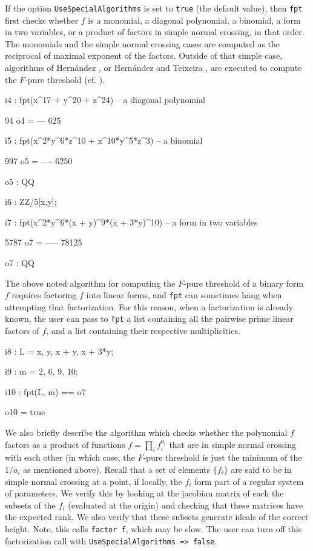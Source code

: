 \documentclass{amsart}
\begin{document}
If the option {\tt UseSpecialAlgorithms} is set to {\tt true} (the default value), then {\tt fpt} first checks whether $f$ is a monomial, a diagonal polynomial, a binomial, a form in two variables, or a product of factors in simple normal crossing, in that order.  The monomials and the simple normal crossing cases are computed as the reciprocal of maximal exponent of the factors.
Outside of that simple case, algorithms of Hern\'andez \cite{HernandezFInvariantsOfDiagonalHyp, HernandezFPureThresholdOfBinomial}, or Hern\'andez and Teixeira \cite{HernandezTeixeiraFThresholdFunctions},  are executed to compute the $F$-pure threshold (cf. \cite{ShibutaTakagiLCThresholds}).

{\small
{}
\begin{MyVerbatim}

i4 : fpt(x^17 + y^20 + z^24) -- a diagonal polynomial

      94
o4 = ---
     625

i5 : fpt(x^2*y^6*z^10 + x^10*y^5*z^3) -- a binomial

      997
o5 = ----
     6250

o5 : QQ

i6 : ZZ/5[x,y];

i7 : fpt(x^2*y^6*(x + y)^9*(x + 3*y)^10) -- a form in two variables

      5787
o7 = -----
     78125

o7 : QQ
\end{MyVerbatim}
}
\medspace

The above noted algorithm for computing the $F$-pure threshold of a binary form $f$ requires factoring $f$ into linear forms, and {\tt fpt} can sometimes hang when attempting that factorization. For this reason, when a factorization is already known, the user can pass to {\tt fpt} a list containing all the pairwise prime linear factors of $f$, and a list containing their respective multiplicities.

{\small
{}
\begin{MyVerbatim}

i8 : L = {x, y, x + y, x + 3*y};

i9 : m = {2, 6, 9, 10};

i10 : fpt(L, m) == o7

o10 = true
\end{MyVerbatim}
}
\medspace
We also briefly describe the algorithm which checks whether the polynomial $f$ factors as a product of functions $f = \prod_i f_i^{a_i}$ that are in simple normal crossing with each other (in which case, the $F$-pure threshold is just the minimum of the $1/a_i$ as mentioned above).  Recall that a set of elements $\{f_i\}$ are said to be in simple normal crossing at a point, if locally, the $f_i$ form part of a regular system of parameters.  We verify this by looking at the jacobian matrix of each the subsets of the $f_i$ (evaluated at the origin) and checking that these matrices have the expected rank.  We also verify that these subsets generate ideals of the correct height.  Note, this calls {\tt factor f}, which may be slow.  The user can turn off this factorization call with {\tt UseSpecialAlgorithms => false}.
\end{document}
